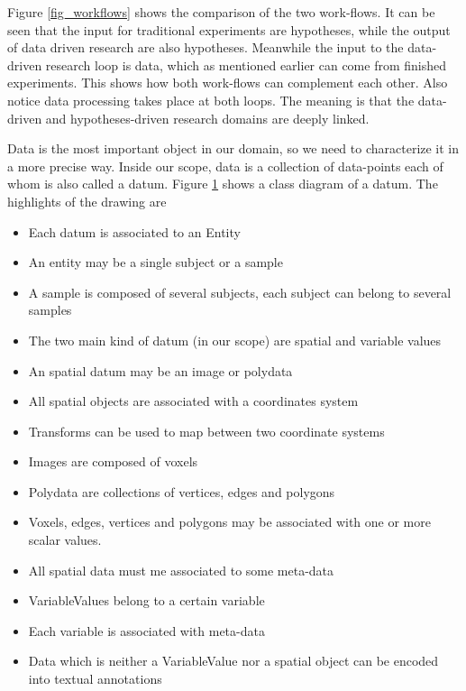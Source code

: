Figure \ref{fig_workflows} shows the comparison of the two work-flows. It can be seen that the input for traditional experiments are hypotheses, while the output of data driven research are also hypotheses. Meanwhile the input to the data-driven research loop is data, which as mentioned earlier can come from finished experiments. This shows how both work-flows can complement each other. Also notice data processing takes place at both loops. The meaning is that the data-driven and hypotheses-driven research domains are deeply linked.  

\begin{figure}

\caption{\label{fig_datum_class}}
\end{figure}

Data is the most important object in our domain, so we need to characterize it in a more precise way. Inside our scope, data is a collection of data-points each of whom is also called a datum. Figure \ref{fig_datum_class} shows a class diagram of a datum. The highlights of the drawing are


\begin{itemize}
\item Each datum is associated to an Entity
\item An entity may be a single subject or a sample
\item A sample is composed of several subjects, each subject can belong to several samples
\item The two main kind of datum (in our scope) are spatial and variable values
\item An spatial datum may be an image or polydata
\item All spatial objects are associated with a coordinates system
\item Transforms can be used to map between two coordinate systems
\item Images are composed of voxels
\item Polydata are collections of vertices, edges and polygons
\item Voxels, edges, vertices and polygons may be associated with one or more scalar values.
\item All spatial data must me associated to some meta-data
\item VariableValues belong to a certain variable
\item Each variable is associated with meta-data  
\item Data which is neither a VariableValue nor a spatial object can be encoded into textual annotations
\end{itemize} 


